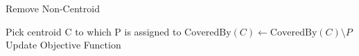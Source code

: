 \begin{algorithm}[H]
    \caption{Remove Non-Centroid}
    \begin{algorithmic}[1]
            \State Pick centroid C to which P is assigned to
            \State $\text{CoveredBy}(C) \gets \text{CoveredBy}(C) \setminus P$
            \State Update Objective Function
        \EndProcedure
    \end{algorithmic}
    \label{alg:bb_rnc}
\end{algorithm}